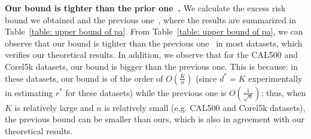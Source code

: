 \documentclass{article}
\begin{document}
\noindent\textbf{Our bound is tighter than the prior one~\cite{wu2023macro-auc}.}
We calculate the excess risk bound we obtained and the previous one~\cite{wu2023macro-auc}, where the results are summarized in Table~\ref{table: upper bound of pa}. From Table~\ref{table: upper bound of pa}, we can observe that our bound is tighter than the previous one~\cite{wu2023macro-auc} in most datasets, which verifies our theoretical results. In addition, we observe that for the CAL500 and Corel5k datasets, our bound is bigger than the previous one. This is because: in these datasets, our bound is of the order of $O(\frac{K}{n})$ (since $d^* = K$ experimentally in estimating $r^*$ for these datasets) while the previous one is $O(\frac{1}{\sqrt{n}})$; thus, when $K$ is relatively large and $n$ is relatively small (e.g. CAL500 and Corel5k datasets), the previous bound can be smaller than ours, which is also in agreement with our theoretical results.




\end{document}
